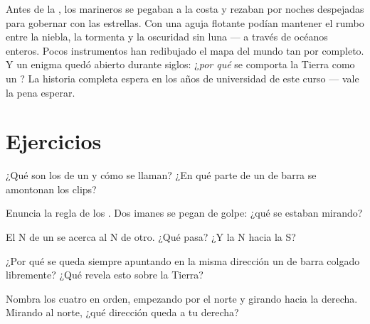 \begin{remark}\label{rem:g4:magnets-and-compass:history}
Antes de la , los marineros se pegaban a la costa y rezaban
por noches despejadas para gobernar con las estrellas. Con una aguja
flotante podían mantener el rumbo entre la niebla, la tormenta y la
oscuridad sin luna --- a través de océanos enteros. Pocos instrumentos
han redibujado el mapa del mundo tan por completo. Y un enigma quedó
abierto durante siglos: ¿\emph{por qué} se comporta la Tierra como un
? La historia completa espera en los años de universidad de
este curso --- vale la pena esperar.
\end{remark}

\section{Ejercicios}

\begin{exercise}[$\star$]\label{exo:g4:magnets-and-compass:1}
¿Qué son los  de un  y cómo se llaman? ¿En qué parte de
un  de barra se amontonan los clips?
\end{exercise}

\begin{exercise}[$\star$]\label{exo:g4:magnets-and-compass:2}
Enuncia la regla de los . Dos imanes se pegan de golpe: ¿qué
 se estaban mirando?
\end{exercise}

\begin{exercise}[$\star$]\label{exo:g4:magnets-and-compass:3}
El  N de un  se acerca al  N de otro. ¿Qué pasa? ¿Y
la N hacia la S?
\end{exercise}

\begin{exercise}[$\star$]\label{exo:g4:magnets-and-compass:4}
¿Por qué se queda siempre apuntando en la misma dirección un 
de barra colgado libremente? ¿Qué revela esto sobre la Tierra?
\end{exercise}

\begin{exercise}[$\star$]\label{exo:g4:magnets-and-compass:5}
Nombra los cuatro  en orden, empezando por el norte
y girando hacia la derecha. Mirando al norte, ¿qué dirección queda a
tu derecha?
\end{exercise}

